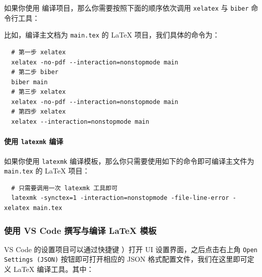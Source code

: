 如果你使用  编译项目，那么你需要按照下面的顺序依次调用 \texttt{xelatex} 与 \texttt{biber} 命令行工具：

\begin{center}
\end{center}

比如，编译主文档为 \texttt{main.tex} 的 {\LaTeX} 项目，我们具体的命令为：

\begin{verbatim}
  # 第一步 xelatex
  xelatex -no-pdf --interaction=nonstopmode main
  # 第二步 biber
  biber main
  # 第三步 xelatex
  xelatex -no-pdf --interaction=nonstopmode main
  # 第四步 xelatex
  xelatex --interaction=nonstopmode main
\end{verbatim}

\paragraph{使用 \texttt{latexmk} 编译}

如果你使用 \texttt{latexmk} 编译模板，那么你只需要使用如下的命令即可编译主文件为 \texttt{main.tex} 的 {\LaTeX} 项目：

\begin{verbatim}
  # 只需要调用一次 latexmk 工具即可
  latexmk -synctex=1 -interaction=nonstopmode -file-line-error -xelatex main.tex
\end{verbatim}

\subsubsection{使用 VS Code 撰写与编译 {\LaTeX} 模板}

VS Code 的设置项目可以通过快捷键 ）打开 UI 设置界面，之后点击右上角 \texttt{Open Settings (JSON)} 按钮即可打开相应的 JSON 格式配置文件，我们在这里即可定义 {\LaTeX} 编译工具。其中：

